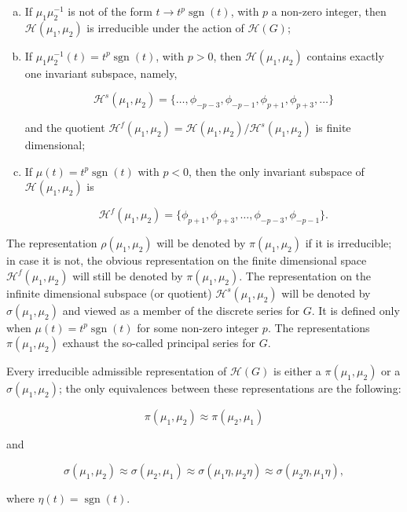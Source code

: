 \begin{theorem}\label{thm:4.4}

\begin{enumerate}[(a)]

\item If $\mu_1\mu_2^{-1}$ is not of the form $t \to t^p\operatorname{sgn}(t)$, with $p$ a non-zero integer, then $\mathcal{H}(\mu_1, \mu_2)$ is irreducible under the action of $\mathcal{H}(G)$;

\item If $\mu_1\mu_2^{-1}(t) = t^p\operatorname{sgn}(t)$, with $p > 0$, then $\mathcal{H}(\mu_1, \mu_2)$ contains exactly one invariant subspace, namely,

\[
\mathcal{H}^s(\mu_1, \mu_2) = \{\dots, \phi_{-p-3}, \phi_{-p-1}, \phi_{p+1}, \phi_{p+3}, \dots\}
\]

and the quotient $\mathcal{H}^f(\mu_1, \mu_2) = \mathcal{H}(\mu_1, \mu_2)/\mathcal{H}^s(\mu_1, \mu_2)$ is finite dimensional;

\item If $\mu(t) = t^p\operatorname{sgn}(t)$ with $p < 0$, then the only invariant subspace of $\mathcal{H}(\mu_1, \mu_2)$ is

\[
\mathcal{H}^f(\mu_1, \mu_2) = \{\phi_{p+1}, \phi_{p+3}, \dots, \phi_{-p-3}, \phi_{-p-1}\}.
\]

\end{enumerate}

\end{theorem}

The representation $\rho(\mu_1, \mu_2)$ will be denoted by $\pi(\mu_1, \mu_2)$ if it is irreducible; in case it is not, the obvious representation on the finite dimensional space $\mathcal{H}^f(\mu_1, \mu_2)$ will still be denoted by $\pi(\mu_1, \mu_2)$. The representation on the infinite dimensional subspace (or quotient) $\mathcal{H}^s(\mu_1, \mu_2)$ will be denoted by $\sigma(\mu_1, \mu_2)$ and viewed as a member of the discrete series for $G$. It is defined only when $\mu(t) = t^p\operatorname{sgn}(t)$ for some non-zero integer $p$. The representations $\pi(\mu_1, \mu_2)$ exhaust the so-called principal series for $G$.

\begin{theorem}\label{thm:4.5}

Every irreducible admissible representation of $\mathcal{H}(G)$ is either a $\pi(\mu_1, \mu_2)$ or a $\sigma(\mu_1, \mu_2)$; the only equivalences between these representations are the following:

\[
\pi(\mu_1, \mu_2) \approx \pi(\mu_2, \mu_1)
\]

and

\[
\sigma(\mu_1, \mu_2) \approx \sigma(\mu_2, \mu_1) \approx \sigma(\mu_1\eta, \mu_2\eta) \approx \sigma(\mu_2\eta, \mu_1\eta),
\]

where $\eta(t) = \operatorname{sgn}(t)$.

\end{theorem}

